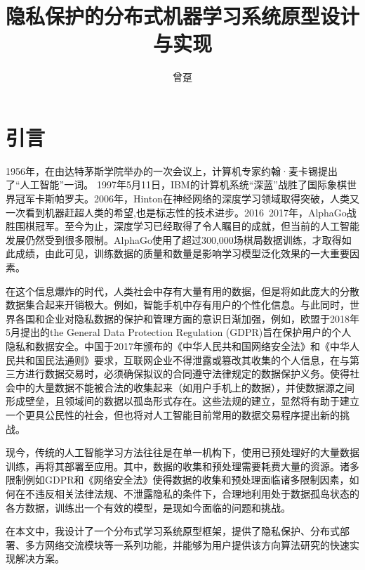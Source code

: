 \documentclass[zihao = -4,cn]{oucart}
\title{隐私保护的分布式机器学习系统原型设计与实现}
\author{曾趸}
\begin{document}
\makecover

\makesignature

\makeabstract

\thispagestyle{tableofcontents}  
\tableofcontents

\newpage
{}
\setcounter{page}{1} 
\section{引言}
1956年，在由达特茅斯学院举办的一次会议上，计算机专家约翰·麦卡锡提出了“人工智能”一词。 1997年5月11日，IBM的计算机系统“深蓝”战胜了国际象棋世界冠军卡斯帕罗夫。2006年，Hinton在神经网络的深度学习领域取得突破\cite{hinton2006fast}，人类又一次看到机器赶超人类的希望,也是标志性的技术进步。2016~2017年，AlphaGo战胜围棋冠军。至今为止，深度学习已经取得了令人瞩目的成就，但当前的人工智能发展仍然受到很多限制。AlphaGo使用了超过300,000场棋局数据训练，才取得如此成绩，由此可见，训练数据的质量和数量是影响学习模型泛化效果的一大重要因素。\par
在这个信息爆炸的时代，人类社会中存有大量有用的数据，但是将如此庞大的分散数据集合起来开销极大。例如，智能手机中存有用户的个性化信息。与此同时，世界各国和企业对隐私数据的保护和管理方面的意识日渐加强，例如，欧盟于2018年5月提出的the General Data Protection Regulation (GDPR)\cite{voigt2017eu}旨在保护用户的个人隐私和数据安全。中国于2017年颁布的《中华人民共和国网络安全法》和《中华人民共和国民法通则》要求，互联网企业不得泄露或篡改其收集的个人信息，在与第三方进行数据交易时，必须确保拟议的合同遵守法律规定的数据保护义务。使得社会中的大量数据不能被合法的收集起来（如用户手机上的数据），并使数据源之间形成壁垒，且领域间的数据以孤岛形式存在。这些法规的建立，显然将有助于建立一个更具公民性的社会，但也将对人工智能目前常用的数据交易程序提出新的挑战。\par
现今，传统的人工智能学习方法往往是在单一机构下，使用已预处理好的大量数据训练，再将其部署至应用。其中，数据的收集和预处理需要耗费大量的资源。诸多限制例如GDPR和《网络安全法》使得数据的收集和预处理面临诸多限制因素，如何在不违反相关法律法规、不泄露隐私的条件下，合理地利用处于数据孤岛状态的各方数据，训练出一个有效的模型，是现如今面临的问题和挑战。\par
在本文中，我设计了一个分布式学习系统原型框架，提供了隐私保护、分布式部署、多方网络交流模块等一系列功能，并能够为用户提供该方向算法研究的快速实现解决方案。\par
\end{document}
